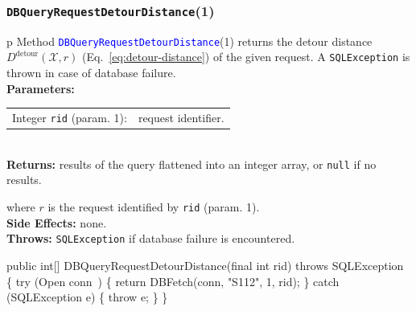 \documentclass{article}
\def\nwendcode{\endtrivlist \endgroup}      %
\let\nwdocspar=\par
\theoremstyle{definition}                   %
\begin{document}
\subsubsection{{\tt{}\protect{}DBQueryRequestDetourDistance}(1)}
\begin{tabular}{p{\textwidth}}
\toprule
{}
Method \textcolor{blue}{{\tt{}\protect{}DBQueryRequestDetourDistance}}(1) returns the
detour distance $D^\textrm{detour}(\mathcal{X},r)$
(Eq.~\ref{eq:detour-distance}) of the given request.
A {\tt{}SQLException} is thrown in case of database failure.\\
\midrule
\textbf{Parameters:}\\
\begin{tabular}{lp{116mm}}
Integer {\tt{}rid} (param. 1):&request identifier.
\end{tabular}\\
\textbf{Returns:} results of the query flattened into an integer array,
or {\tt{}null} if no results.


where $r$ is the request identified by {\tt{}rid} (param. 1).\\
\textbf{Side Effects:} none.\\
\textbf{Throws:} {\tt{}SQLException} if database failure is encountered.\\
\bottomrule
\end{tabular}
\nwenddocs{}\plusendmoddef
public int[] DBQueryRequestDetourDistance(final int rid) throws SQLException \{
  try (\LA{}Open \code{}conn\edoc{}~{\nwtagstyle{}}\RA{}) \{
    return DBFetch(conn, "S112", 1, rid);
  \} catch (SQLException e) \{
    throw e;
  \}
\}
\eatline
{}\nwendcode{}\nwdocspar
\end{document}
